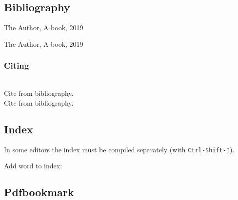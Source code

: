 \subsection{Bibliography}
\begin{minipage}{0.6\textwidth}
\begin{latex}
\begin{thebibliography}{99}
   The Author, A book, 2019
\end{thebibliography}
\end{latex}
\end{minipage}
\begin{minipage}{0.4\textwidth}
\vspace*{-2.5cm}
\begin{thebibliography}{99}
   The Author, A book, 2019
\end{thebibliography}
\end{minipage}

\subsubsection{Citing}
\begin{latex}
\hrulefill\\
  Cite from bibliography\cite{author/19}.\\
  Cite from bibliography\cite[Chapter VI, VII]{author/19}.
\end{latex}

\subsection{Index}
In some editors the index must be compiled separately (with \texttt{Ctrl-Shift-I}).\\
\begin{latex}
\usepackage{makeidx}
\makeindex

\printindex

Add word to index: 
\end{latex}

\subsection{Pdfbookmark}
\begin{latex}
\end{latex}
